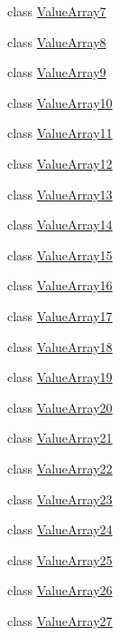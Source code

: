 \begin{DoxyCompactItemize}
\item 
class \hyperlink{classtesting_1_1internal_1_1ValueArray7}{Value\-Array7}
\item 
class \hyperlink{classtesting_1_1internal_1_1ValueArray8}{Value\-Array8}
\item 
class \hyperlink{classtesting_1_1internal_1_1ValueArray9}{Value\-Array9}
\item 
class \hyperlink{classtesting_1_1internal_1_1ValueArray10}{Value\-Array10}
\item 
class \hyperlink{classtesting_1_1internal_1_1ValueArray11}{Value\-Array11}
\item 
class \hyperlink{classtesting_1_1internal_1_1ValueArray12}{Value\-Array12}
\item 
class \hyperlink{classtesting_1_1internal_1_1ValueArray13}{Value\-Array13}
\item 
class \hyperlink{classtesting_1_1internal_1_1ValueArray14}{Value\-Array14}
\item 
class \hyperlink{classtesting_1_1internal_1_1ValueArray15}{Value\-Array15}
\item 
class \hyperlink{classtesting_1_1internal_1_1ValueArray16}{Value\-Array16}
\item 
class \hyperlink{classtesting_1_1internal_1_1ValueArray17}{Value\-Array17}
\item 
class \hyperlink{classtesting_1_1internal_1_1ValueArray18}{Value\-Array18}
\item 
class \hyperlink{classtesting_1_1internal_1_1ValueArray19}{Value\-Array19}
\item 
class \hyperlink{classtesting_1_1internal_1_1ValueArray20}{Value\-Array20}
\item 
class \hyperlink{classtesting_1_1internal_1_1ValueArray21}{Value\-Array21}
\item 
class \hyperlink{classtesting_1_1internal_1_1ValueArray22}{Value\-Array22}
\item 
class \hyperlink{classtesting_1_1internal_1_1ValueArray23}{Value\-Array23}
\item 
class \hyperlink{classtesting_1_1internal_1_1ValueArray24}{Value\-Array24}
\item 
class \hyperlink{classtesting_1_1internal_1_1ValueArray25}{Value\-Array25}
\item 
class \hyperlink{classtesting_1_1internal_1_1ValueArray26}{Value\-Array26}
\item 
class \hyperlink{classtesting_1_1internal_1_1ValueArray27}{Value\-Array27}
\item 

\end{DoxyCompactItemize}

